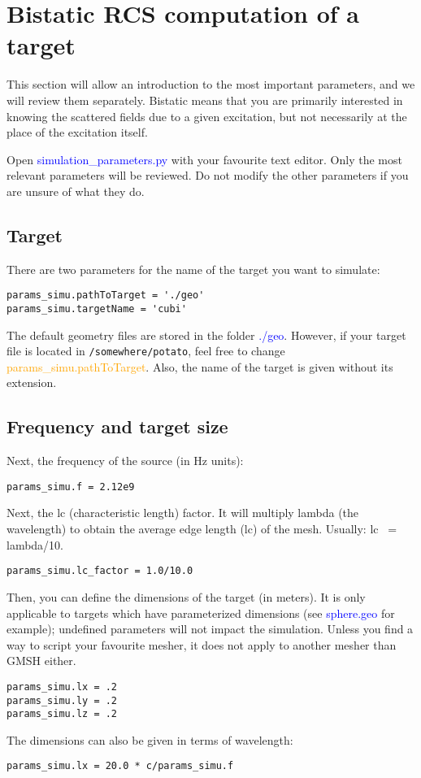 \documentclass[a4paper,10pt]{book}
\newcommand{\file}[1] {\textcolor{blue}{\textsf{#1}}}
\newcommand{\parameter}[1] {\textcolor{orange}{\textsf{#1}}}
\begin{document}
\section{Bistatic RCS computation of a target}
%
This section will allow an introduction to the most important parameters, and we will review them separately. Bistatic means that you are primarily interested in knowing the scattered fields due to a given excitation, but not necessarily at the place of the excitation itself.
%
\par
Open \file{simulation\_parameters.py} with your favourite text editor. Only the most relevant parameters will be reviewed. Do not modify the other parameters if you are unsure of what they do.

\subsection{Target}
%
\par
There are two parameters for the name of the target you want to simulate:
\begin{verbatim}
params_simu.pathToTarget = './geo'
params_simu.targetName = 'cubi'
\end{verbatim}
The default geometry files are stored in the folder \file{./geo}. However, if your target file is located in \texttt{/somewhere/potato}, feel free to change \parameter{params\_simu.pathToTarget}. Also, the name of the target is given without its extension.

\subsection{Frequency and target size}
%
\par
Next, the frequency of the source (in Hz units):
\begin{verbatim}
params_simu.f = 2.12e9
\end{verbatim}
%
\par
Next, the lc (characteristic length) factor. It will multiply lambda (the wavelength) to obtain the average edge length (lc) of the mesh. Usually: lc ~= lambda/10.
\begin{verbatim}
params_simu.lc_factor = 1.0/10.0
\end{verbatim}
%
\par
Then, you can define the dimensions of the target (in meters). It is only applicable to targets which have parameterized dimensions (see \file{sphere.geo} for example); undefined parameters will not impact the simulation. Unless you find a way to script your favourite mesher, it does not apply to another mesher than GMSH either.
\begin{verbatim}
params_simu.lx = .2
params_simu.ly = .2
params_simu.lz = .2
\end{verbatim}
The dimensions can also be given in terms of wavelength:
\begin{verbatim}
params_simu.lx = 20.0 * c/params_simu.f
\end{verbatim}
\end{document}
